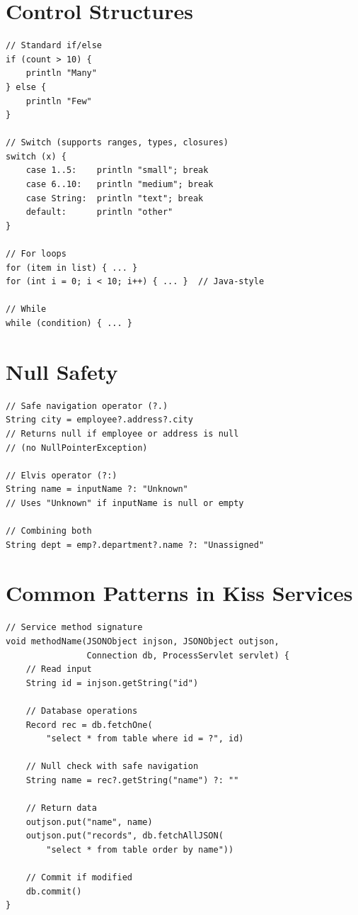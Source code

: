 \section{Control Structures}
\label{sec:gp-control}

\begin{lstlisting}[style=groovy]
// Standard if/else
if (count > 10) {
    println "Many"
} else {
    println "Few"
}

// Switch (supports ranges, types, closures)
switch (x) {
    case 1..5:    println "small"; break
    case 6..10:   println "medium"; break
    case String:  println "text"; break
    default:      println "other"
}

// For loops
for (item in list) { ... }
for (int i = 0; i < 10; i++) { ... }  // Java-style

// While
while (condition) { ... }
\end{lstlisting}

\section{Null Safety}
\label{sec:gp-null}

\begin{lstlisting}[style=groovy]
// Safe navigation operator (?.)
String city = employee?.address?.city
// Returns null if employee or address is null
// (no NullPointerException)

// Elvis operator (?:)
String name = inputName ?: "Unknown"
// Uses "Unknown" if inputName is null or empty

// Combining both
String dept = emp?.department?.name ?: "Unassigned"
\end{lstlisting}

\section{Common Patterns in Kiss Services}
\label{sec:gp-kiss-patterns}

\begin{lstlisting}[style=groovy]
// Service method signature
void methodName(JSONObject injson, JSONObject outjson,
                Connection db, ProcessServlet servlet) {
    // Read input
    String id = injson.getString("id")

    // Database operations
    Record rec = db.fetchOne(
        "select * from table where id = ?", id)

    // Null check with safe navigation
    String name = rec?.getString("name") ?: ""

    // Return data
    outjson.put("name", name)
    outjson.put("records", db.fetchAllJSON(
        "select * from table order by name"))

    // Commit if modified
    db.commit()
}
\end{lstlisting}

